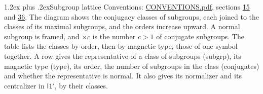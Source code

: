 \documentclass[10pt,a4paper]{article}
\makeatletter
\renewcommand\section{\@startsection{section}{1}{\z@}{-3ex plus -1ex minus -.2ex}%
  {1.2ex plus .2ex}{\normalfont\large\sffamily\bfseries\color{parttitle}}}
\numberwithin{equation}{section}
\newcommand{\grp}[1]{\mathsf{#1}}
\makeatother
\begin{document}
\section{Subgroup lattice}\label{s:subgroups}
Conventions: \href{../../CONVENTIONS.pdf}{CONVENTIONS.pdf}, sections \href{../../../rotation/CONVENTIONS.pdf\#conv.15}{15} and \href{../../CONVENTIONS.pdf\#conv.36}{36}.
The diagram shows the conjugacy classes of subgroups, each joined to the classes of its maximal subgroups, and the orders increase upward. \label{n:index.conjugates.c}\label{n:mark.conjugates}A normal subgroup is framed, and ${\times}c$ is the number $c > 1$ of conjugate subgroups. The table lists the classes by order, then by magnetic type, those of one symbol together. \label{n:head.subgroup}\label{n:head.magnetic.type}\label{n:head.order}\label{n:head.conjugates}\label{n:head.normal}A row gives the representative of a class of subgroups (subgrp), its magnetic type (type), its order, the number of subgroups in the class (conjugates) and whether the representative is normal. \label{n:head.normalizer}\label{n:head.centralizer}It also gives its normalizer and its centralizer in $\grp{I1'}$, by their classes. 
\end{document}
